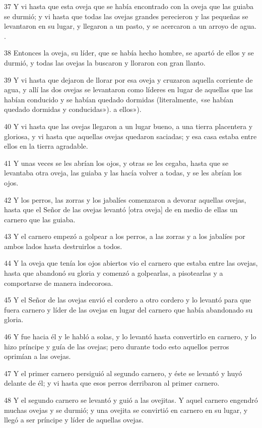 \par 37 Y vi hasta que esta oveja que se había encontrado con la oveja que las guiaba se durmió; y vi hasta que todas las ovejas grandes perecieron y las pequeñas se levantaron en su lugar, y llegaron a un pasto, y se acercaron a un arroyo de agua. .
\par 38 Entonces la oveja, su líder, que se había hecho hombre, se apartó de ellos y se durmió, y todas las ovejas la buscaron y lloraron con gran llanto.
\par 39 Y vi hasta que dejaron de llorar por esa oveja y cruzaron aquella corriente de agua, y allí las dos ovejas se levantaron como líderes en lugar de aquellas que las habían conducido y se habían quedado dormidas (literalmente, «se habían quedado dormidas y conducidas»). a ellos»).
\par 40 Y vi hasta que las ovejas llegaron a un lugar bueno, a una tierra placentera y gloriosa, y vi hasta que aquellas ovejas quedaron saciadas; y esa casa estaba entre ellos en la tierra agradable.
\par 41 Y unas veces se les abrían los ojos, y otras se les cegaba, hasta que se levantaba otra oveja, las guiaba y las hacía volver a todas, y se les abrían los ojos.
\par 42 Y los perros, las zorras y los jabalíes comenzaron a devorar aquellas ovejas, hasta que el Señor de las ovejas levantó [otra oveja] de en medio de ellas un carnero que las guiaba.
\par 43 Y el carnero empezó a golpear a los perros, a las zorras y a los jabalíes por ambos lados hasta destruirlos a todos.
\par 44 Y la oveja que tenía los ojos abiertos vio el carnero que estaba entre las ovejas, hasta que abandonó su gloria y comenzó a golpearlas, a pisotearlas y a comportarse de manera indecorosa.
\par 45 Y el Señor de las ovejas envió el cordero a otro cordero y lo levantó para que fuera carnero y líder de las ovejas en lugar del carnero que había abandonado su gloria.
\par 46 Y fue hacia él y le habló a solas, y lo levantó hasta convertirlo en carnero, y lo hizo príncipe y guía de las ovejas; pero durante todo esto aquellos perros oprimían a las ovejas.
\par 47 Y el primer carnero persiguió al segundo carnero, y éste se levantó y huyó delante de él; y vi hasta que esos perros derribaron al primer carnero.
\par 48 Y el segundo carnero se levantó y guió a las ovejitas. Y aquel carnero engendró muchas ovejas y se durmió; y una ovejita se convirtió en carnero en su lugar, y llegó a ser príncipe y líder de aquellas ovejas.

